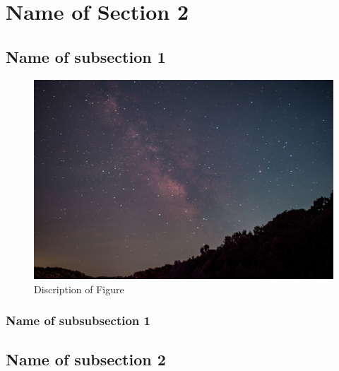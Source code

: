 \section{Name of Section 2}

 



\subsection{Name of subsection 1}

\begin{figure}
  \centering
  \includegraphics[width=0.65\linewidth]{Figure Folder/Figure.jpg}
  \caption{Discription of Figure}
  \label{fig:label of Figure}
\end{figure}


\subsubsection{Name of subsubsection 1}

\subsection{Name of subsection 2}

